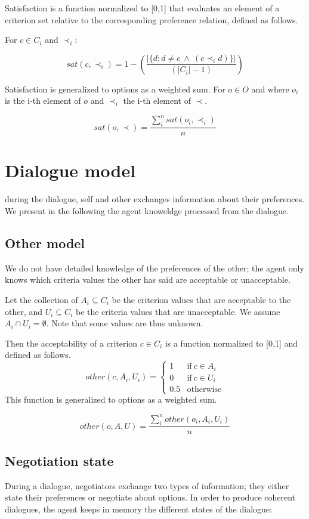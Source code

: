 \documentclass{article}
\begin{document}
	Satisfaction is a function normalized to [0,1] that evaluates an element of a criterion set relative to the corresponding preference relation, defined as follows.
	
	For $c \in C_i$ and $\prec_i$:
	
	$$sat(c, \prec_i) =	1 - \left( \frac{|\{d : d \neq c \  \wedge \ (c \prec_i d)\}| }{( |C_i| - 1 )}\right)  $$
	
	Satisfaction is generalized to options as a weighted sum.
	For $o \in O$ and where $o_i$ is the i-th element of $o$ and $\prec_i$ the i-th element of $\prec$.
	
	$$sat(o, \prec) = \frac{\sum_{i}^{n} sat(o_i, \prec_i) }{n} $$
	
	
	\section{Dialogue model}
	during the dialogue, self and other exchanges information about their preferences. We present in the following the agent knoweldge processed from the dialogue.
	\subsection{Other model}
		We do not have detailed knowledge of the preferences of the other; the agent only knows which criteria values the other has said are acceptable or unacceptable.

		Let the collection of $A_i \subseteq C_i$ be the criterion values that are acceptable to the other, and $U_i \subseteq C_i$ be the criteria values that are unacceptable.  We assume $A_i \cap U_i = \emptyset$.  Note	that some values are thus unknown.

		Then the acceptability of a criterion $c \in C_i$ is a function normalized to [0,1] and defined as follows.
		$$ other(c, A_i, U_i)= \left\{\begin{array}{ll}
			1	 & \mathrm{if\ }  c \in A_i\\
			0    & \mathrm{if\ }c \in U_i\\
			0.5	 & \mathrm{otherwise}
			\end{array}\right.$$
		This function is generalized to options as a weighted sum.
	
		$$other(o, A, U) = \frac{ \sum_{i}^{n} other(o_i, A_i, U_i) } {n}$$ 
	
	\subsection{Negotiation state}
		During a dialogue, negotiators exchange two types of information; they either state their preferences or negotiate about options. In order to produce coherent dialogues, the agent keeps in memory the different states of the dialogue: 
		
\end{document}
